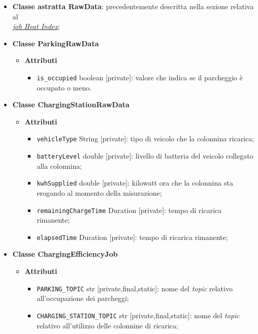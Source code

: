 \begin{itemize}
	\item \textbf{Classe astratta RawData}: precedentemente descritta nella sezione relativa al \\\hyperref[abstract_class_raw_data]{\textit{\underline{job Heat Index}}};
	\item \textbf{Classe ParkingRawData}
	      \begin{itemize}
		      \item \textbf{Attributi}
		            \begin{itemize}
			            \item \texttt{is\_occupied} boolean [private]: valore che indica se il parcheggio è occupato o meno.
		            \end{itemize}
	      \end{itemize}
	\item \textbf{Classe ChargingStationRawData}
	      \begin{itemize}
		      \item \textbf{Attributi}
		            \begin{itemize}
			            \item \texttt{vehicleType} String [private]: tipo di veicolo che la colonnina ricarica;
			            \item \texttt{batteryLevel} double [private]: livello di batteria del veicolo collegato alla colonnina;
			            \item \texttt{kwhSupplied} double [private]: kilowatt ora che la colonnina sta erogando al momento della misurazione;
			            \item \texttt{remainingChargeTime} Duration [private]: tempo di ricarica rimanente;
			            \item \texttt{elapsedTime} Duration [private]: tempo di ricarica rimanente;
		            \end{itemize}
	      \end{itemize}
	\item \textbf{Classe ChargingEfficiencyJob}
	      \begin{itemize}
		      \item \textbf{Attributi}
		            \begin{itemize}
			            \item \texttt{PARKING\_TOPIC} str [private,final,static]: nome del \textit{topic} relativo all'occupazione dei parcheggi;
			            \item \texttt{CHARGING\_STATION\_TOPIC} str [private,final,static]: nome del \textit{topic} relativo all'utilizzo delle colonnine di ricarica;

\end{itemize}
\end{itemize}
\end{itemize}
